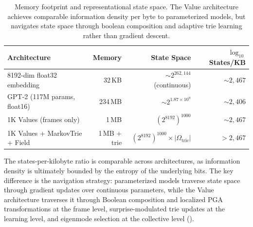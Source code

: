 \begin{table}[h]
  \centering
  \caption{Memory footprint and representational state space.  The Value
           architecture achieves comparable information density per byte
           to parameterized models, but navigates state space through
           boolean composition and adaptive trie learning rather than
           gradient descent.}
  \label{tab:capacity_comparison}
  \begin{tabular}{lrrr}
    \toprule
    \textbf{Architecture}
      & \textbf{Memory}
      & \textbf{State Space}
      & \textbf{$\log_{10}$ States/KB} \\
    \midrule
    8192-dim float32 embedding
      & 32\,KB
      & $\sim 2^{262{,}144}$ (continuous)
      & $\sim 2{,}467$ \\
    GPT-2 (117M params, float16)
      & 234\,MB
      & $\sim 2^{1.87 \times 10^9}$
      & $\sim 2{,}406$ \\
    \addlinespace
    1K Values (frames only)
      & 1\,MB
      & $(2^{8192})^{1000}$
      & $\sim 2{,}467$ \\
    1K Values + MarkovTrie + Field
      & 1\,MB + trie
      & $(2^{8192})^{1000} \times |\Omega_{\text{trie}}|$
      & $> 2{,}467$ \\
    \bottomrule
  \end{tabular}
\end{table}

The states-per-kilobyte ratio is comparable across architectures, as
information density is ultimately bounded by the entropy of the
underlying bits.  The key difference is the navigation strategy:
parameterized models traverse state space through gradient updates
over continuous parameters, while the Value architecture traverses it
through Boolean composition and localized PGA transformations at the
frame level, surprise-modulated trie updates at the learning level, and
eigenmode selection at the collective level ().
